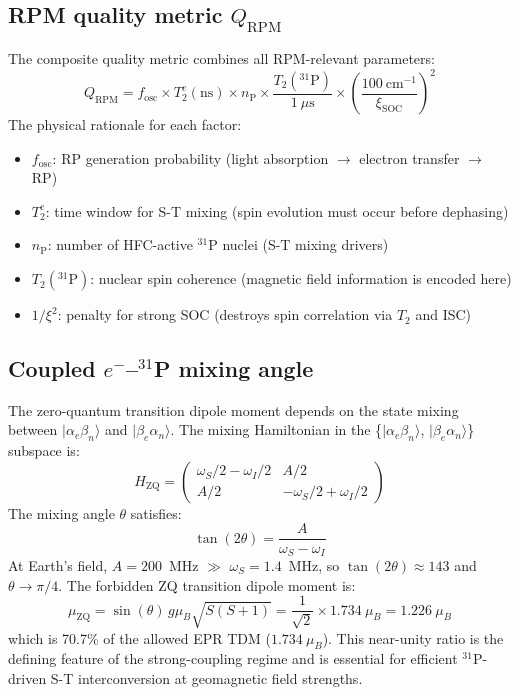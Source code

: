 \subsection{RPM quality metric $Q_\mathrm{RPM}$}

The composite quality metric combines all RPM-relevant parameters:
\begin{equation}
Q_\mathrm{RPM} = f_\mathrm{osc} \times T_2^e(\mathrm{ns}) \times n_\mathrm{P} \times \frac{T_2(^{31}\mathrm{P})}{1~\mu\mathrm{s}} \times \left(\frac{100~\mathrm{cm}^{-1}}{\xi_\mathrm{SOC}}\right)^2
\label{eq:Q}
\end{equation}
The physical rationale for each factor:
\begin{itemize}
\item $f_\mathrm{osc}$: RP generation probability (light absorption $\rightarrow$ electron transfer $\rightarrow$ RP)
\item $T_2^e$: time window for S-T mixing (spin evolution must occur before dephasing)
\item $n_\mathrm{P}$: number of HFC-active $^{31}$P nuclei (S-T mixing drivers)
\item $T_2(^{31}\mathrm{P})$: nuclear spin coherence (magnetic field information is encoded here)
\item $1/\xi^2$: penalty for strong SOC (destroys spin correlation via $T_2$ and ISC)
\end{itemize}

\subsection{Coupled $e^-$--$^{31}$P mixing angle}

The zero-quantum transition dipole moment depends on the state mixing between $|\alpha_e\beta_n\rangle$ and $|\beta_e\alpha_n\rangle$. The mixing Hamiltonian in the \{$|\alpha_e\beta_n\rangle$, $|\beta_e\alpha_n\rangle$\} subspace is:
\begin{equation}
H_\mathrm{ZQ} = \begin{pmatrix} \omega_S/2 - \omega_I/2 & A/2 \\ A/2 & -\omega_S/2 + \omega_I/2 \end{pmatrix}
\end{equation}
The mixing angle $\theta$ satisfies:
\begin{equation}
\tan(2\theta) = \frac{A}{\omega_S - \omega_I}
\end{equation}
At Earth's field, $A = 200$~MHz $\gg$ $\omega_S = 1.4$~MHz, so $\tan(2\theta) \approx 143$ and $\theta \rightarrow \pi/4$. The forbidden ZQ transition dipole moment is:
\begin{equation}
\mu_\mathrm{ZQ} = \sin(\theta)\,g\mu_B\sqrt{S(S+1)} = \frac{1}{\sqrt{2}} \times 1.734~\mu_B = 1.226~\mu_B
\end{equation}
which is 70.7\% of the allowed EPR TDM ($1.734~\mu_B$). This near-unity ratio is the defining feature of the strong-coupling regime and is essential for efficient $^{31}$P-driven S-T interconversion at geomagnetic field strengths.

